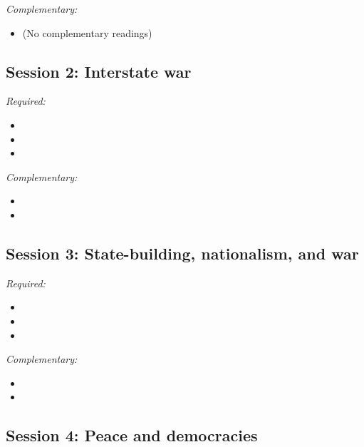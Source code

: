 \documentclass[12pt, a4paper]{article}
\begin{document}

\noindent\textit{Complementary:}

\begin{itemize}
  \item (No complementary readings)
\end{itemize}

\hline
\subsection*{Session 2: Interstate war}

\noindent\textit{Required:}

\begin{itemize}
  \item
  \item
  \item
\end{itemize}

\noindent\textit{Complementary:}

\begin{itemize}
  \item
  \item
\end{itemize}

\hline
\subsection*{Session 3: State-building, nationalism, and war}

\noindent\textit{Required:}

\begin{itemize}
  \item
  \item
  \item
\end{itemize}

\noindent\textit{Complementary:}

\begin{itemize}
  \item
  \item
\end{itemize}

\hline
\subsection*{Session 4: Peace and democracies}
\end{document}
